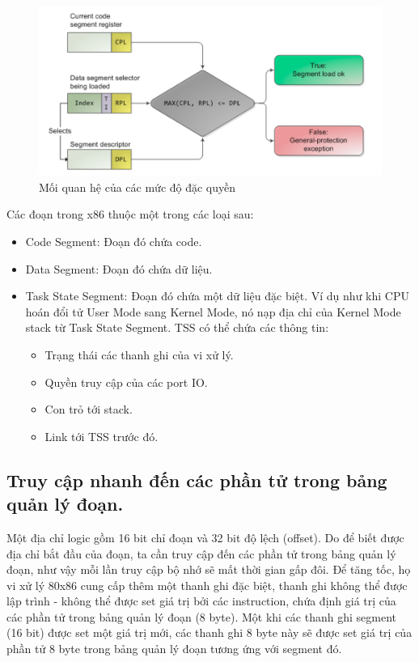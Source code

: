 \documentclass[12pt]{report}
\begin{document}
\begin{figure}[h]
\centering
\caption{Mối quan hệ của các mức độ đặc quyền}
\includegraphics[width=12cm]{plevel.png}
\end{figure}

Các đoạn trong x86 thuộc một trong các loại sau:
\begin{itemize}
\item Code Segment: Đoạn đó chứa code.
\item Data Segment: Đoạn đó chứa dữ liệu. 
\item Task State Segment: Đoạn đó chứa một dữ liệu đặc biệt. Ví dụ như khi CPU hoán đổi tử User Mode sang Kernel Mode, nó nạp địa chỉ của Kernel Mode stack từ Task State Segment. TSS có thể chứa các thông tin: \cite{task_state_segment}
\begin{itemize}
\item Trạng thái các thanh ghi của vi xử lý. 
\item Quyền truy cập của các port IO. 
\item Con trỏ tới stack. 
\item Link tới TSS trước đó. 
\end{itemize}
\end{itemize}

\subsection{Truy cập nhanh đến các phần tử trong bảng quản lý đoạn.}
Một địa chỉ logic gồm 16 bit chỉ đoạn và 32 bit độ lệch (offset). Do để biết được địa chỉ bắt đầu của đoạn, ta cần truy cập đến các phần tử trong bảng quản lý đoạn, như vậy mỗi lần truy cập bộ nhớ sẽ mất thời gian gấp đôi. Để tăng tốc, họ vi xử lý 80x86 cung cấp thêm một thanh ghi đặc biệt, thanh ghi không thể được lập trình - không thể được set giá trị bởi các instruction, chứa định giá trị của các phần tử trong bảng quản lý đoạn (8 byte). Một khi các thanh ghi segment (16 bit) được set một giá trị mới, các thanh ghi 8 byte này sẽ được set giá trị của phần tử 8 byte trong bảng quản lý đoạn tương ứng với segment đó. 
\end{document}
